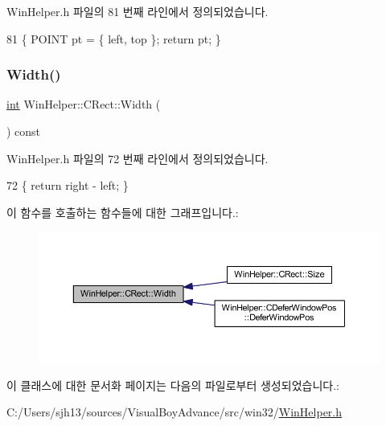 Win\+Helper.\+h 파일의 81 번째 라인에서 정의되었습니다.


\begin{DoxyCode}
81 \{ POINT pt = \{ left, top \}; \textcolor{keywordflow}{return} pt; \}   
\end{DoxyCode}
\mbox{\label{class_win_helper_1_1_c_rect_acde8c61514d7814ab1d7c5f91e549a80}} 
\subsubsection{\texorpdfstring{Width()}{Width()}}
{\footnotesize\ttfamily \mbox{\hyperlink{_util_8cpp_a0ef32aa8672df19503a49fab2d0c8071}{int}} Win\+Helper\+::\+C\+Rect\+::\+Width (\begin{DoxyParamCaption}{ }\end{DoxyParamCaption}) const\hspace{0.3cm}{\ttfamily [inline]}}



Win\+Helper.\+h 파일의 72 번째 라인에서 정의되었습니다.


\begin{DoxyCode}
72 \{ \textcolor{keywordflow}{return} right - left; \}
\end{DoxyCode}
이 함수를 호출하는 함수들에 대한 그래프입니다.\+:
\nopagebreak
\begin{figure}[H]
\begin{center}
\leavevmode
\includegraphics[width=350pt]{class_win_helper_1_1_c_rect_acde8c61514d7814ab1d7c5f91e549a80_icgraph}
\end{center}
\end{figure}


이 클래스에 대한 문서화 페이지는 다음의 파일로부터 생성되었습니다.\+:\begin{DoxyCompactItemize}
\item 
C\+:/\+Users/sjh13/sources/\+Visual\+Boy\+Advance/src/win32/\mbox{\hyperlink{_win_helper_8h}{Win\+Helper.\+h}}\end{DoxyCompactItemize}
